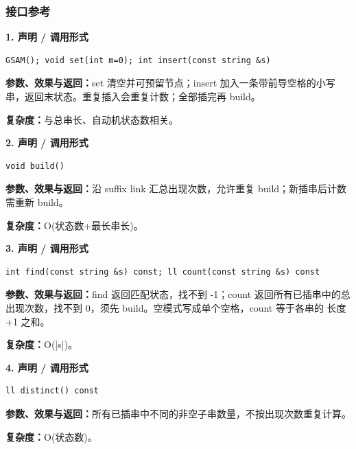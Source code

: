 \documentclass[UTF8,a4paper,10pt]{ctexart}
\begin{document}
\subsubsection*{接口参考}
\noindent\begin{minipage}{\textwidth}
\textbf{1. 声明 / 调用形式}
\begin{lstlisting}
GSAM(); void set(int m=0); int insert(const string &s)
\end{lstlisting}
\textbf{参数、效果与返回：}set 清空并可预留节点；insert 加入一条带前导空格的小写串，返回末状态。重复插入会重复计数；全部插完再 build。

\textbf{复杂度：}与总串长、自动机状态数相关。

\end{minipage}\par\vspace{0.4em}
\noindent\begin{minipage}{\textwidth}
\textbf{2. 声明 / 调用形式}
\begin{lstlisting}
void build()
\end{lstlisting}
\textbf{参数、效果与返回：}沿 suffix link 汇总出现次数，允许重复 build；新插串后计数需重新 build。

\textbf{复杂度：}O(状态数+最长串长)。

\end{minipage}\par\vspace{0.4em}
\noindent\begin{minipage}{\textwidth}
\textbf{3. 声明 / 调用形式}
\begin{lstlisting}
int find(const string &s) const; ll count(const string &s) const
\end{lstlisting}
\textbf{参数、效果与返回：}find 返回匹配状态，找不到 -1；count 返回所有已插串中的总出现次数，找不到 0，须先 build。空模式写成单个空格，count 等于各串的 长度+1 之和。

\textbf{复杂度：}O(|s|)。

\end{minipage}\par\vspace{0.4em}
\noindent\begin{minipage}{\textwidth}
\textbf{4. 声明 / 调用形式}
\begin{lstlisting}
ll distinct() const
\end{lstlisting}
\textbf{参数、效果与返回：}所有已插串中不同的非空子串数量，不按出现次数重复计算。

\textbf{复杂度：}O(状态数)。

\end{minipage}\par\vspace{0.4em}
\end{document}
